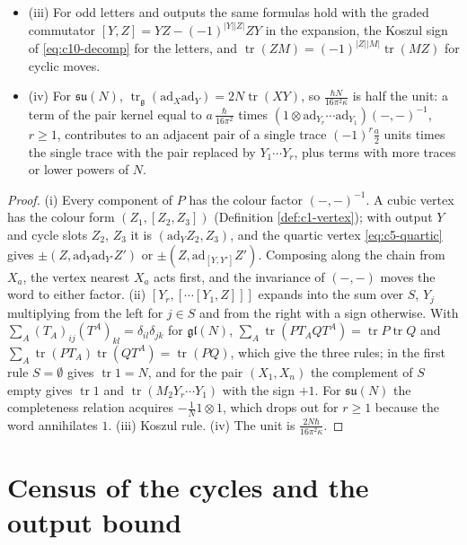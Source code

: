 \begin{lemma}
\begin{itemize}
\item (iii) For odd letters and outputs the same formulas hold with the graded commutator $[Y,Z]=YZ-(-1)^{|Y||Z|}ZY$ in the expansion, the Koszul sign of \eqref{eq:c10-decomp} for the letters, and $\operatorname{tr}(ZM)=(-1)^{|Z||M|}\operatorname{tr}(MZ)$ for cyclic moves.
\item (iv) For $\mathfrak{su}(N)$, $\operatorname{tr}_{\mathfrak g}(\mathrm{ad}_X\mathrm{ad}_Y)=2N\operatorname{tr}(XY)$, so $\frac{\hbar N}{16\pi^2\kappa}$ is half the unit: a term of the pair kernel equal to $a\,\frac{\hbar}{16\pi^2}$ times $(1\otimes\mathrm{ad}_{Y_r}\cdots\mathrm{ad}_{Y_1})(-,-)^{-1}$, $r\ge1$, contributes to an adjacent pair of a single trace $(-1)^r\tfrac a2$ units times the single trace with the pair replaced by $Y_1\cdots Y_r$, plus terms with more traces or lower powers of $N$.
\end{itemize}
\end{lemma}

\begin{proof}
(i) Every component of $P$ has the colour factor $(-,-)^{-1}$. A cubic vertex has the colour form $(Z_1,[Z_2,Z_3])$ (Definition \ref{def:c1-vertex}); with output $Y$ and cycle slots $Z_2$, $Z_3$ it is $(\mathrm{ad}_YZ_2,Z_3)$, and the quartic vertex \eqref{eq:c5-quartic} gives $\pm(Z,\mathrm{ad}_Y\mathrm{ad}_{Y'}Z')$ or $\pm(Z,\mathrm{ad}_{[Y,Y']}Z')$. Composing along the chain from $X_a$, the vertex nearest $X_a$ acts first, and the invariance of $(-,-)$ moves the word to either factor. (ii) $[Y_r,[\cdots[Y_1,Z]]]$ expands into the sum over $S$, $Y_j$ multiplying from the left for $j\in S$ and from the right with a sign otherwise. With $\sum_A(T_A)_{ij}(T^A)_{kl}=\delta_{il}\delta_{jk}$ for $\mathfrak{gl}(N)$, $\sum_A\operatorname{tr}(PT_AQT^A)=\operatorname{tr}P\operatorname{tr}Q$ and $\sum_A\operatorname{tr}(PT_A)\operatorname{tr}(QT^A)=\operatorname{tr}(PQ)$, which give the three rules; in the first rule $S=\emptyset$ gives $\operatorname{tr}1=N$, and for the pair $(X_1,X_n)$ the complement of $S$ empty gives $\operatorname{tr}1$ and $\operatorname{tr}(M_2Y_r\cdots Y_1)$ with the sign $+1$. For $\mathfrak{su}(N)$ the completeness relation acquires $-\tfrac1N1\otimes1$, which drops out for $r\ge1$ because the word annihilates $1$. (iii) Koszul rule. (iv) The unit is $\frac{2N\hbar}{16\pi^2\kappa}$.
\end{proof}

\section{Census of the cycles and the output bound}

